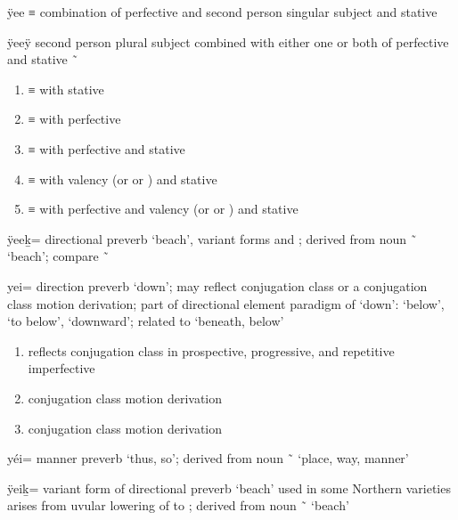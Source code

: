 \begin{morphdesc}[resume*=alphalist]
\item[ÿee]
	≡ 
	combination of perfective 
		and second person singular subject 
		and stative 

\item[ÿeeÿ]
	second person plural subject  combined with either one or both of
		perfective 
		and stative  \~\ 
	\begin{enumerate}
	\item	{} ≡ 
		with stative 
	\item	{} ≡ 
		with perfective 
	\item	{} ≡ 
		with perfective 
		and stative 
	\item	{} ≡ 
		with valency 
			(or   or  )
		and stative 
	\item	{} ≡ 
		with perfective 
		and valency 
			(or   or  )
		and stative 
	\end{enumerate}

\item[ÿeeḵ=]
	directional preverb ‘beach’, variant forms  and ;
	derived from noun  \~\  ‘beach’;
	compare  \~\ 

\item[yei=]\label{m:yei=}
	direction preverb ‘down’;
	may reflect  conjugation class or a  conjugation class motion derivation;
	part of directional element paradigm of  ‘down’:
		 ‘below’,  ‘to below’,  ‘downward’;
	related to  ‘beneath, below’
	\begin{enumerate}
	\item	reflects  conjugation class in prospective, progressive, and repetitive imperfective
	\item	{} conjugation class motion derivation
	\item	{} conjugation class motion derivation
	\end{enumerate}

\item[yéi=]
	manner preverb ‘thus, so’;
	derived from noun  \~\  ‘place, way, manner’

\item[ÿeiḵ=]\label{m:ÿeiḵ=}
	variant form of directional preverb  ‘beach’ used in some Northern varieties
	arises from uvular lowering of  to ;
	derived from noun  \~\  ‘beach’


\end{morphdesc}
